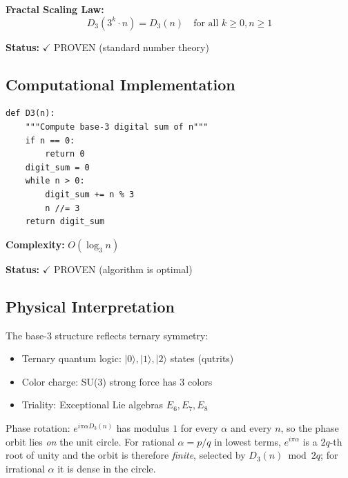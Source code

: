 \textbf{Fractal Scaling Law:}
\begin{equation}
D_3(3^k \cdot n) = D_3(n) \quad \text{for all } k \geq 0, n \geq 1
\end{equation}

\textbf{Status:} $\checkmark$ PROVEN (standard number theory)

\subsection{Computational Implementation}

\begin{verbatim}
def D3(n):
    """Compute base-3 digital sum of n"""
    if n == 0:
        return 0
    digit_sum = 0
    while n > 0:
        digit_sum += n % 3
        n //= 3
    return digit_sum
\end{verbatim}

\textbf{Complexity:} $O(\log_3 n)$

\textbf{Status:} $\checkmark$ PROVEN (algorithm is optimal)

\subsection{Physical Interpretation}

The base-3 structure reflects ternary symmetry:
\begin{itemize}
\item Ternary quantum logic: $|0\rangle, |1\rangle, |2\rangle$ states (qutrits)
\item Color charge: SU(3) strong force has 3 colors
\item Triality: Exceptional Lie algebras $E_6, E_7, E_8$
\end{itemize}

Phase rotation: $e^{i\pi\alpha D_3(n)}$ has modulus $1$ for every
$\alpha$ and every $n$, so the phase orbit lies \emph{on} the unit circle. For
rational $\alpha = p/q$ in lowest terms, $e^{i\pi\alpha}$ is a $2q$-th root of
unity and the orbit is therefore \emph{finite}, selected by $D_3(n) \bmod 2q$;
for irrational $\alpha$ it is dense in the circle.

